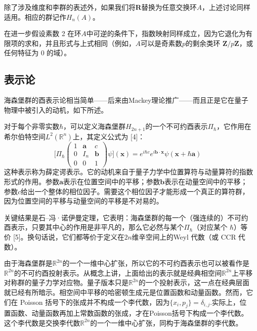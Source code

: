 除了涉及维度和李群的表述外，如果我们将$\mathbf{R}$替换为任意交换环$A$，上述讨论同样适用。相应的群记作$H_{n}(A)$。

在进一步假设素数 2 在环$A$中可逆的条件下，指数映射同样成立，因为它退化为有限项的求和，并且形式与上式相同（例如，$A$可以是奇素数$p$的剩余类环 $\mathbf{Z}/p\mathbf{Z}$，或任何特征为 0 的域）。
\subsection{表示论}
海森堡群的酉表示论相当简单——后来由Mackey理论推广——而且正是它在量子物理中被引入的动机，如下所述。

对于每个非零实数$\hbar$，可以定义海森堡群$H_{2n+1}$的一个不可约酉表示$\Pi_{\hbar}$，它作用在希尔伯特空间$L^{2}(\mathbb{R}^{n})$上，其定义公式为 [4]：
$$
\bigg[\Pi_{\hbar}
\begin{pmatrix}
1 & \mathbf{a} & c \\
0 & I_{n} & \mathbf{b} \\
0 & 0 & 1
\end{pmatrix}
\psi \bigg](\mathbf{x})
=
e^{i\hbar c} e^{i \mathbf{b}\cdot \mathbf{x}} \psi(\mathbf{x} + \hbar \mathbf{a})~
$$
这种表示称为薛定谔表示。它的动机来自于量子力学中位置算符与动量算符的指数形式的作用。参数$\mathbf{a}$表示在位置空间中的平移；参数$\mathbf{b}$表示在动量空间中的平移；参数$c$给出一个整体的相位因子。需要这个相位因子才能形成一个真正的算符群，因为位置空间的平移与动量空间的平移是不对易的。

关键结果是石–冯·诺伊曼定理，它表明：海森堡群的每一个（强连续的）不可约酉表示，只要其中心的作用是非平凡的，那么它必然与某个$\Pi_{\hbar}$（对应某个 $\hbar$）等价 [5]。换句话说，它们都等价于定义在$2n$维辛空间上的Weyl 代数（或 CCR 代数）。

由于海森堡群是$\mathbb{R}^{2n}$的一个一维中心扩张，所以它的不可约酉表示也可以被看作是$\mathbb{R}^{2n}$的不可约酉投射表示。从概念上讲，上面给出的表示就是经典相空间$\mathbb{R}^{2n}$上平移对称群的量子力学对应物。量子版本只是$\mathbb{R}^{2n}$的一个投射表示，这一点在经典层面就已经有所暗示。相空间中平移的哈密顿生成元是位置函数和动量函数。然而，它们在 Poisson 括号下的张成并不构成一个李代数，因为$\{x_{i}, p_{j}\} = \delta_{i,j}$.实际上，位置函数、动量函数再加上常数函数的张成，才在Poisson括号下构成一个李代数。这个李代数是交换李代数$\mathbb{R}^{2n}$的一个一维中心扩张，同构于海森堡群的李代数。
